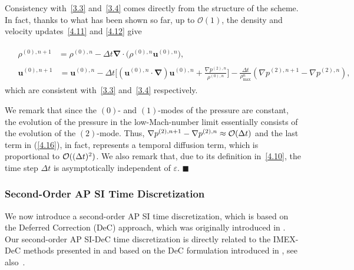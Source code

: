 \documentclass[A4paper,12pt,twoside]{article}
\newenvironment{proof}{{\flushleft \bf Proof:}}{}
\numberwithin{equation}{section}
\numberwithin{figure}{section}
\numberwithin{table}{section}
\def\bnabla{\bm{\nabla}}
\newcommand{\dt}{\Delta t}
\newcommand{\ve}{\varepsilon}
\newcommand\eref[1]{(\ref{#1})}
\newcommand*\xbar[1]{%
  \hbox{%
    \vbox{%
      \hrule height 0.5pt %
      \kern0.4ex%
      \hbox{%
        \kern-0.05em%
        \ensuremath{#1}%
        \kern-0.00em%
      }%
    }%
  }%
}
\newcommand{\lore}[1]{{\leavevmode\color{red} #1}}
\begin{document}
\begin{proof}
Consistency with~\eqref{3.3} and~\eqref{3.4} comes directly from the structure of the scheme. In fact, thanks to what has been shown so far, up to $\mathcal{O}(1)$, the density and velocity updates~\eqref{4.11} and \eqref{4.12} give



\begin{align}
	&\begin{aligned}
		\rho^{(0),n+1}&=\rho^{(0),n}-\dt\bnabla\!\cdot\!\big(\rho^{(0),n}\bm u^{(0),n}\big),
	\end{aligned}\\
	&\begin{aligned}
		\bm u^{(0),n+1}&=\bm u^{(0),n}-\dt\bigg[(\bm u^{(0),n}\!\cdot\!\bnabla)\bm u^{(0),n}+\frac{\nabla p^{(2),n}}{\rho^{(0),n}}\bigg]-\frac{\dt}{\rho_{\max}^n}\left(\nabla p^{(2),n+1}-\nabla p^{(2),n}\right)\label{4.16},
	\end{aligned}
\end{align}
which are consistent with~\eqref{3.3} and~\eqref{3.4} respectively.

We remark that since the $(0)$- and $(1)$-modes of the pressure are constant, the evolution of the
pressure in the low-Mach-number limit essentially consists of the evolution of the $(2)$-mode. Thus,
$\nabla p^{(2),n+1}-\nabla p^{(2),n}\approx{\cal O}(\dt)$ and the last term in \eref{4.16}, in fact, represents a temporal diffusion term,
which is proportional to ${\cal O}((\dt)^2)$.
We also remark that, due to its definition in~\eqref{4.10}, the time step $\dt$ is asymptotically independent of $\ve$.
\hfill$\blacksquare$
\end{proof}

\subsubsection{Second-Order AP SI Time Discretization}\label{sec313}
We now introduce a second-order AP SI time discretization, which is based on the Deferred Correction (DeC) approach, which was \lore{originally introduced} 
in \cite{fox1949some}. Our second-order AP SI-DeC time discretization is directly related to the IMEX-DeC methods presented in
\cite{offner2025analysis} and based on the DeC formulation introduced in \cite{Decremi}, \lore{see also~\cite{micalizzi2025efficient,micalizzi2024new}}.
\end{document}
